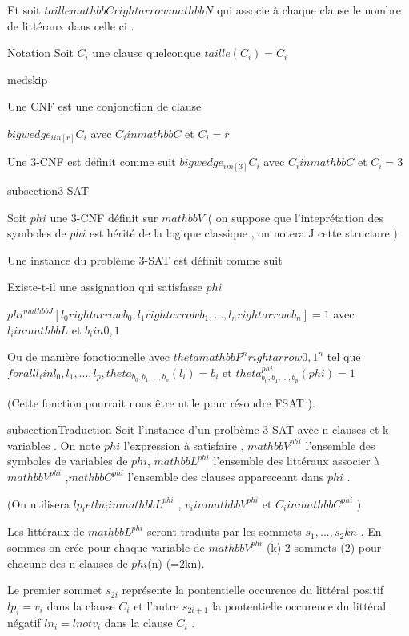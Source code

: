 Et soit $taille  mathbb{C} rightarrow mathbb{N}$ qui associe à chaque clause le nombre de littéraux dans celle ci . 

Notation  Soit $C_i$ une clause quelconque $taille(C_i)=C_i$

medskip

Une CNF est une conjonction de clause 

$bigwedge_{i in [r]}C_i$ avec $C_i in mathbb{C}$ et $C_i = r$

Une 3-CNF est définit comme suit
$bigwedge_{i in [3] }C_i$ avec $C_i in mathbb{C}$ et $C_i=3$

subsection{3-SAT}


Soit $phi$ une 3-CNF définit sur $mathbb{V}$  ( on suppose que l'inteprétation des symboles de $phi$ est hérité de la logique classique , on notera J cette structure ).


Une instance du problème 3-SAT est définit comme suit 

Existe-t-il une assignation qui satisfasse $phi$ 

$phi^{mathbb{J}}[l_0rightarrow b_0,l_1rightarrow b_1,...,l_nrightarrow b_n] = 1$ avec $l_i in mathbb{L} $ et $b_i in {0,1} $

Ou de manière fonctionnelle avec $theta  mathbb{P}^n rightarrow {{0,1}}^n$
tel que $forall l_i in {l_0,l_1,...,l_p} ,theta_{b_0,b_1,...,b_p}(l_i)=b_i$ et $theta_{b_0,b_1,...,b_p}^{phi}(phi) = 1 $

(Cette fonction pourrait nous être utile pour résoudre FSAT ).

subsection{Traduction  }
Soit l'instance d'un prolbème 3-SAT avec n clauses et k variables .
On note $phi$ l'expression à satisfaire , $mathbb{V}^{phi}$ l'ensemble des symboles de variables de $phi$, $mathbb{L}^{phi}$ l'ensemble des littéraux associer à $mathbb{V}^{phi}$ ,$mathbb{C}^{phi}$ l'ensemble des clauses appareceant dans $phi$ .


(On utilisera 
$lp_i et ln_i in mathbb{L}^{phi}$ , $v_i in mathbb{V}^{phi}$  et $C_i in mathbb{C}^{phi}$  ) 


Les littéraux de $mathbb{L}^{phi}$  seront traduits par les sommets ${s_1,...,s_2kn}$ . 
En sommes on crée pour chaque variable de $mathbb{V}^{phi}$ (k) 2 sommets (2) pour chacune des n clauses de $phi$(n) (=2kn).

Le premier sommet $s_{2i}$ représente la pontentielle occurence du littéral positif $lp_i=v_i$ dans la clause $C_i$ et l'autre  $s_{2i+1}$ la pontentielle occurence du littéral négatif  $ln_i=lnot v_i$ dans la clause $C_i$ .


